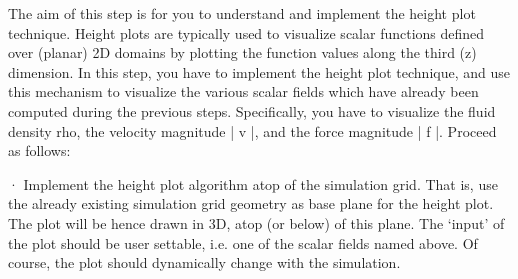 
The aim of this step is for you to understand and implement the height plot technique. Height plots are typically used to visualize scalar functions defined over (planar) 2D domains by plotting the function values along the third (z) dimension. In this step, you have to implement the height plot technique, and use this mechanism to visualize the various scalar fields which have already been computed during the previous steps. Specifically, you have to visualize the fluid density rho, the velocity magnitude | v |, and the force magnitude | f |. Proceed as follows:
 
 
 
·        Implement the height plot algorithm atop of the simulation grid. That is, use the already existing simulation grid geometry as base plane for the height plot. The plot will be hence drawn in 3D, atop (or below) of this plane. The ‘input’ of the plot should be user settable, i.e. one of the scalar fields named above. Of course, the plot should dynamically change with the simulation.


